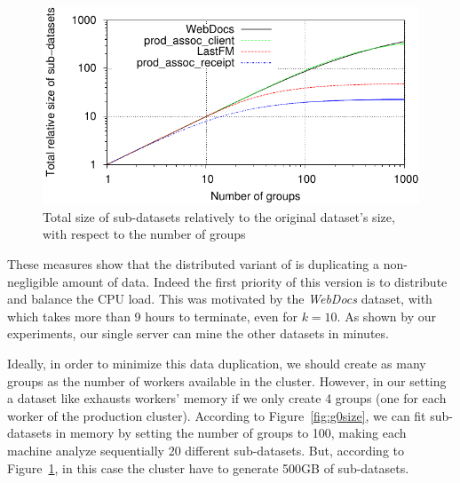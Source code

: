 \begin{figure}
	\centering
	\includegraphics{fig/toppi/G_all_size/relativeSize-total.pdf}
	\caption{\label{fig:gAllSize}Total size of sub-datasets
		relatively to the original dataset's size,
		with respect to the number of groups}
\end{figure}

These measures show that the distributed variant of \toppi is duplicating a non-negligible amount of data.
Indeed the first priority of this version is to distribute and balance the CPU load.
This was motivated by the {\em WebDocs} dataset,
with which \toppi takes more than 9 hours to terminate, even for $k=10$.
As shown by our experiments,
our single server can mine the other datasets in minutes.

Ideally, in order to minimize this data duplication,
we should create as many groups as the number of workers available in the cluster.
However, in our setting a dataset like \prodassocreceipt exhausts workers' memory
if we only create 4 groups (one for each worker of the production cluster).
According to Figure~\ref{fig:g0size}, we can fit sub-datasets in memory by setting the number of groups to 100,
making each machine analyze sequentially 20 different sub-datasets.
But, according to Figure~\ref{fig:gAllSize},
in this case the cluster have to generate 500GB of sub-datasets.


